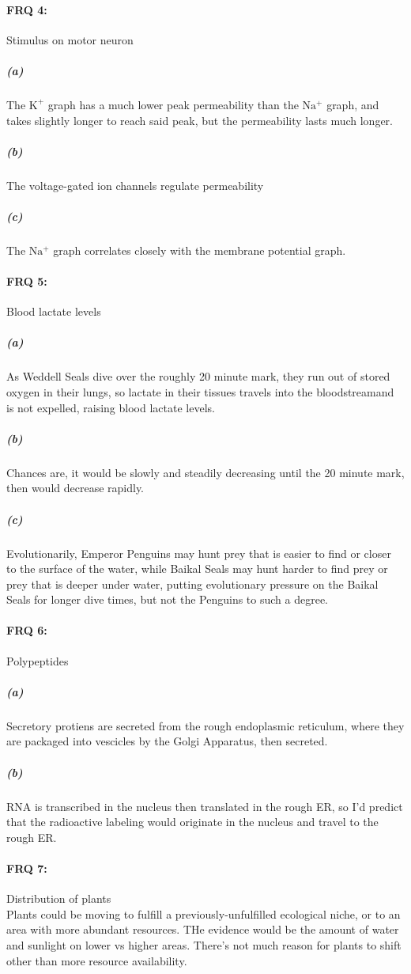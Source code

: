 \documentclass[12pt]{article}
\begin{document}
    \paragraph{FRQ 4:} Stimulus on motor neuron
        \subparagraph*{(a)} The $\mathrm{K^+}$ graph has a much lower peak permeability than the $\mathrm{Na^+}$ graph, and takes slightly longer to reach said peak, but the permeability lasts much longer.
        \subparagraph*{(b)} The voltage-gated ion channels regulate permeability
        \subparagraph*{(c)} The $\mathrm{Na^+}$ graph correlates closely with the membrane potential graph.

    \paragraph{FRQ 5:} Blood lactate levels
        \subparagraph*{(a)} As Weddell Seals dive over the roughly 20 minute mark, they run out of stored oxygen in their lungs, so lactate in their tissues travels into the bloodstreamand is not expelled, raising blood lactate levels.
        \subparagraph*{(b)} Chances are, it would be slowly and steadily decreasing until the 20 minute mark, then would decrease rapidly.
        \subparagraph*{(c)} Evolutionarily, Emperor Penguins may hunt prey that is easier to find or closer to the surface of the water, while Baikal Seals may hunt harder to find prey or prey that is deeper under water, putting evolutionary pressure on the Baikal Seals for longer dive times, but not the Penguins to such a degree.

    \paragraph{FRQ 6:} Polypeptides
        \subparagraph*{(a)} Secretory protiens are secreted from the rough endoplasmic reticulum, where they are packaged into vescicles by the Golgi Apparatus, then secreted.
        \subparagraph*{(b)} RNA is transcribed in the nucleus then translated in the rough ER, so I'd predict that the radioactive labeling would originate in the nucleus and travel to the rough ER.

    \paragraph{FRQ 7:} Distribution of plants\\
        Plants could be moving to fulfill a previously-unfulfilled ecological niche, or to an area with more abundant resources. THe evidence would be the amount of water and sunlight on lower vs higher areas. There's not much reason for plants to shift other than more resource availability.
\end{document}
